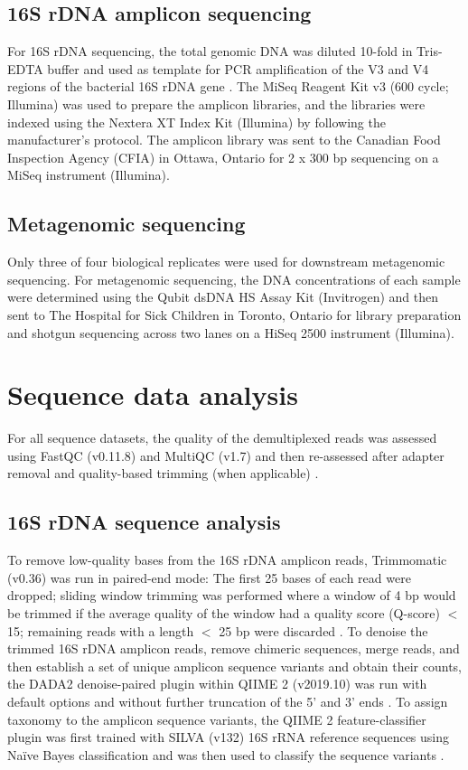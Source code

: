 \subsection{16S rDNA amplicon sequencing}

For 16S rDNA sequencing, the total genomic DNA was diluted 10-fold in Tris-EDTA buffer and used as template for PCR amplification of the V3 and V4 regions of the bacterial 16S rDNA gene \dummytab.
The MiSeq Reagent Kit v3 (600 cycle; Illumina) was used to prepare the amplicon libraries, and the libraries were indexed using the Nextera\textsuperscript{\textregistered{}} XT Index Kit (Illumina) by following the manufacturer’s protocol.
The amplicon library was sent to the Canadian Food Inspection Agency (CFIA) in Ottawa, Ontario for 2 x 300 bp sequencing on a MiSeq instrument (Illumina).

\subsection{Metagenomic sequencing}

Only three of four biological replicates were used for downstream metagenomic sequencing.
For metagenomic sequencing, the DNA concentrations of each sample were determined using the Qubit\textsuperscript{\texttrademark{}} dsDNA HS Assay Kit (Invitrogen) and then sent to The Hospital for Sick Children in Toronto, Ontario for library preparation and shotgun sequencing across two lanes on a HiSeq 2500 instrument (Illumina).

\section{Sequence data analysis}

For all sequence datasets, the quality of the demultiplexed reads was assessed using FastQC (v0.11.8) and MultiQC (v1.7) and then re-assessed after adapter removal and quality-based trimming (when applicable) \parencite{Andrews.2010, Ewels.2016}.

\subsection{16S rDNA sequence analysis}

To remove low-quality bases from the 16S rDNA amplicon reads, Trimmomatic (v0.36) was run in paired-end mode:
The first 25 bases of each read were dropped; sliding window trimming was performed where a window of 4 bp would be trimmed if the average quality of the window had a quality score (Q-score) $<$ 15; remaining reads with a length $<$ 25 bp were discarded \parencite{Bolger.2014}.
To denoise the trimmed 16S rDNA amplicon reads, remove chimeric sequences, merge reads, and then establish a set of unique amplicon sequence variants and obtain their counts, the DADA2 denoise-paired plugin  within QIIME 2 (v2019.10) was run with default options and without further truncation of the 5’ and 3’ ends \parencite{Callahan.2016, Bolyen.2019}.
To assign taxonomy to the amplicon sequence variants, the QIIME 2 feature-classifier plugin was first trained with SILVA (v132) 16S rRNA reference sequences using Naïve Bayes classification and was then used to classify the sequence variants \parencite{Quast.2013}.


